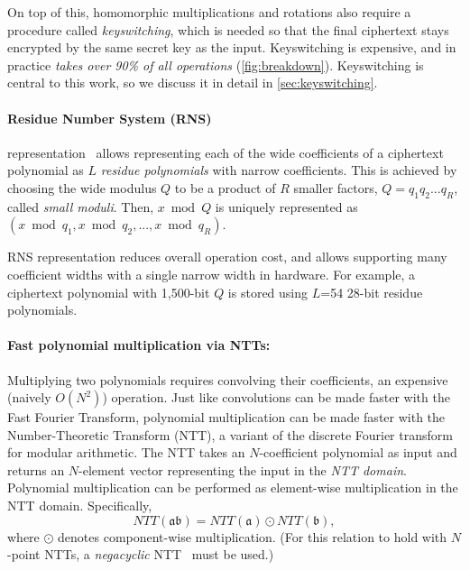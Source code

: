 \tblComputeBreakdown

On top of this, homomorphic multiplications and rotations also require a procedure called \emph{keyswitching},
which is needed so that the final ciphertext
stays encrypted by the same secret key as the input.
Keyswitching is expensive, and in practice \emph{takes over 90\% of all
operations} (\autoref{fig:breakdown}).
Keyswitching is central to this work, so we discuss it in detail in \autoref{sec:keyswitching}.

\paragraph{Residue Number System (RNS)}
representation~\cite{garner:1959:residue}
allows representing each of the wide coefficients of a ciphertext polynomial as $L$ \emph{residue polynomials}
with narrow coefficients. This is achieved by choosing the wide modulus $Q$ to be a product of $R$ smaller factors, $Q = q_1q_2...q_R$, called \emph{small moduli}.
Then, $x \bmod Q$ is uniquely represented as $(x \bmod q_1, x \bmod q_2, ..., x \bmod q_R)$.

RNS representation 
reduces overall operation cost, and allows supporting many coefficient widths with a single narrow width in hardware.
For example, a ciphertext polynomial with 1,500-bit $Q$ is stored using $L$=54 28-bit residue polynomials.


\paragraph{Fast polynomial multiplication via NTTs:}
Multiplying two polynomials requires convolving their coefficients, an
expensive (naively $O(N^2)$) operation.
Just like convolutions can be made faster with the Fast Fourier Transform,
polynomial multiplication can be made faster with the Number-Theoretic Transform (NTT),  %
a variant of the discrete Fourier transform for modular arithmetic.
The NTT takes an $N$\hyp{}coefficient polynomial as input and returns an $N$\hyp{}element vector representing the input in the
\textit{NTT domain}. Polynomial multiplication can be performed as element-wise multiplication in the NTT domain. Specifically,
\begin{equation*}
    NTT(\mathfrak{a}\mathfrak{b}) = NTT(\mathfrak{a}) \odot NTT(\mathfrak{b}),
\end{equation*}
where $\odot$ denotes component-wise multiplication. 
(For this relation to hold with $N$\hyp{}point NTTs, a \emph{negacyclic} NTT~\cite{lyubashevsky2013ideal} must be used.)

